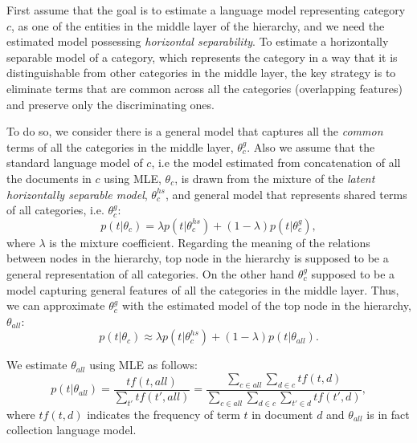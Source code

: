 First assume that the goal is to estimate a language model representing category $c$, as one of the entities in the middle layer of the hierarchy, and we need the estimated model possessing \emph{horizontal separability}. 
To estimate a horizontally separable model of a category, which represents the category in a way that it is distinguishable from other categories in the middle layer, the key strategy is to eliminate terms that are common across all the categories (overlapping features) and preserve only the discriminating ones.

To do so, we consider there is a general model that captures all the \emph{common} terms of all the categories in the middle layer, $\theta_c^{g}$.  Also we assume that the standard language model of $c$, i.e the model estimated  from concatenation of all the documents in $c$ using MLE, $\theta_{c}$, is drawn from the mixture of the \emph{latent horizontally separable model}, $\theta_{c}^{hs}$, and general model that represents shared terms of all categories, i.e. $\theta_c^{g}$:
\begin{equation}
p(t|\theta_{c})  =  \lambda p(t|\theta_{c}^{hs}) + (1-\lambda) p(t|\theta_c^g),
\end{equation}
%
where $\lambda$ is the mixture coefficient.
Regarding the meaning of the relations between nodes in the hierarchy, top node in the hierarchy is supposed to be a general representation of all categories. On the other hand $\theta_c^{g}$ supposed to be a model capturing general features of all the categories in the middle layer. Thus, we can approximate $\theta_c^{g}$ with the estimated model of the top node in the hierarchy, $\theta_{all}$:
\begin{equation}
 p(t|\theta_c) \approx \lambda p(t|\theta_{c}^{hs}) + (1-\lambda) p(t|\theta_{all}).
 \label{mixture}
\end{equation}

We estimate $\theta_{all}$ using MLE as follows:
\begin{equation}
p(t|\theta_{all}) = \frac{tf(t,all)}{\sum_{t'} tf(t',all)} = \frac{\sum_{c \in all}{\sum_{d \in c}{tf(t,d)}}}{{\sum_{c \in all}{\sum_{d \in c}{\sum_{t' \in d}{tf(t',d)}}}}},
\label{eq:cmodel}
\end{equation}
where $tf(t,d)$ indicates the frequency of term $t$ in document $d$ and $\theta_{all}$ is in fact collection language model. 

